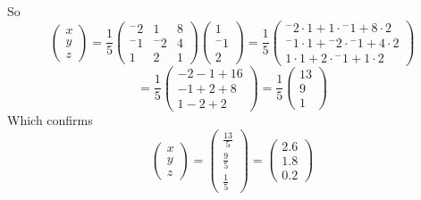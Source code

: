 \documentclass{article}
\begin{document}
\begin{enumerate}
\begin{enumerate}[i.]
So
\[
	\left(
		\begin{array}{c}
			x \\
			y \\
			z
		\end{array}
	\right)
	=
	\frac{1}{5}
	\left(
		\begin{array}{ccc}
			{^-}2 &        1 & 8 \\
			{^-}1 & {^-}2 & 4 \\
			1        &         2 & 1
		\end{array}	
	\right)
	\left(
		\begin{array}{c}
			       1 \\
			{^-}1 \\
			       2
		\end{array}
	\right)
	=
	\frac{1}{5}
	\left(
		\begin{array}{c}
			 {^-}2 \cdot 1 +        1 \cdot {^-}1 +  8 \cdot2 \\
			 {^-}1 \cdot 1 + {^-}2 \cdot {^-}1 +  4 \cdot 2 \\
			         1 \cdot 1 +        2 \cdot {^-}1 +  1 \cdot 2
		\end{array}
	\right)
\]
\[
	=
	\frac{1}{5}
	\left(
		\begin{array}{c}
			 -2 - 1 +16 \\
			 -1 + 2 + 8 \\
			 1 - 2 + 2
		\end{array}
	\right)
	=
	\frac{1}{5}
	\left(
		\begin{array}{c}
			 13 \\
			 9 \\
			 1
		\end{array}
	\right)
\]
Which confirms
\[
	\left(
		\begin{array}{c}
			x \\
			y \\
			z
		\end{array}
	\right)
	=
	\left(
		\begin{array}{c}
			\frac{13}{5} \\
			\frac{9}{5} \\
			\frac{1}{5}
		\end{array}
	\right)
	=
	\left(
		\begin{array}{c}
			2.6 \\
			1.8 \\
			0.2
		\end{array}
	\right)
\]
\\

\end{enumerate}


\end{enumerate}
\end{document}
